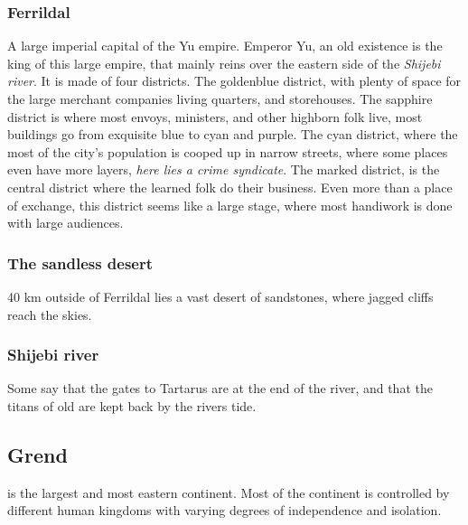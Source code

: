 \documentclass[a4paper]{article}
\begin{document}
\subsubsection{Ferrildal}
A large imperial capital of the Yu empire. Emperor Yu, an old existence is the king of this large empire, that mainly reins over the eastern side of the \textit{Shijebi river}. It is made of four districts. The goldenblue district, with plenty of space for the large merchant companies living quarters, and storehouses. The sapphire district is where most envoys, ministers, and other highborn folk live, most buildings go from exquisite blue to cyan and purple. The cyan district, where the most of the city's population is cooped up in narrow streets, where some places even have more layers, \textit{here lies a crime syndicate}. The marked district, is the central district where the learned folk do their business. Even more than a place of exchange, this district seems like a large stage, where most handiwork is done with large audiences.

\subsubsection{The sandless desert}
40 km outside of Ferrildal lies a vast desert of sandstones, where jagged cliffs reach the skies.


\subsubsection{Shijebi river}
Some say that the gates to Tartarus are at the end of the river, and that the titans of old are kept back by the rivers tide.


\subsection{Grend}
is the largest and most eastern continent. Most of the continent is controlled by different human kingdoms with varying degrees of independence and isolation.
\end{document}
